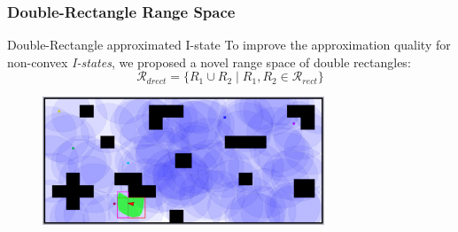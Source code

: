 \subsubsection[Double-Rectangle Range Space]{Double-Rectangle Range Space}
\begin{frame}{Double-Rectangle approximated I-state}
  To improve the approximation quality for non-convex \emph{I-states},
  we proposed a novel range space of \textcolor[rgb]{1.00,0.00,0.00}{double rectangles}: \\
  \begin{equation}
    \mathcal{R}_{drect} = \{ R_1 \cup R_2 \mid R_1, R_2 \in \mathcal{R}_{rect} \}
  \end{equation}
  \begin{figure}
    \includegraphics[width=0.75\textwidth]{figs/dbrect_clutter}
  \end{figure}
\end{frame}

